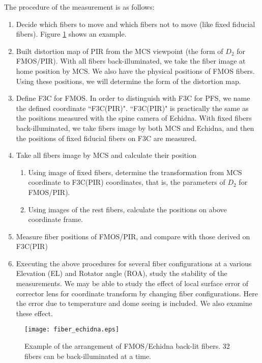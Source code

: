 The procedure of the measurement is as follows:
\begin{enumerate}
\item Decide which fibers to move and which fibers not to move (like fixed fiducial fibers).
Figure \ref{fig:fibEchidna} shows an example.
\item Built distortion map of PIR from the MCS viewpoint (the form of $D_2$ for FMOS/PIR).
With all fibers back-illuminated, we take the fiber image at home position by MCS.
We also have the physical positions of FMOS fibers.
Using these positions, we will determine the form of the distortion map.
\item Define F3C for FMOS. 
In order to distinguish with F3C for PFS, we name the defined coordinate ``F3C(PIR)". 
``F3C(PIR)" is practically the same as the positions measured with the spine camera of Echidna.
With fixed fibers back-illuminated, we take fibers image by both MCS and Echidna, and then the positions of fixed fiducial fibers on F3C are measured.
\item Take all fibers image by MCS and calculate their position
\begin{enumerate}
\item Using image of fixed fibers, determine the transformation from MCS coordinate to F3C(PIR) coordinates, that is, the parameters of $D_2$ for FMOS/PIR). 
\item Using images of the rest fibers, calculate the positions on above coordinate frame.
\end{enumerate}
\item Measure fiber positions of FMOS/PIR, and compare with those derived on F3C(PIR)
\item Executing the above procedures for several fiber configurations at a various Elevation (EL) and Rotator angle (ROA), study the stability of the measurements.
We may be able to study the effect of local surface error of corrector lens for coordinate transform by changing fiber configurations.
Here the error due to temperature and dome seeing is included.
We also examine these effect.
\end{enumerate}

\begin{figure}[!ht]
\begin{center}
\texttt{[image: fiber\_echidna.eps]}
\end{center}
\caption{
Example of the arrangement of FMOS/Echidna back-lit fibers.
32 fibers can be back-illuminated at a time. }
\label{fig:fibEchidna}
\end{figure}

